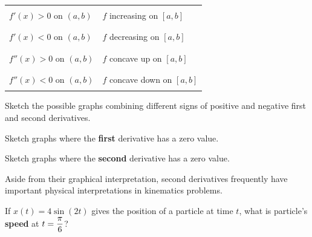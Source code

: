 {\huge
\vsc
\begin{center}
\begin{tabular}{|l|l|} \hline
\qquad \qquad \qquad \qquad \qquad  \qquad \qquad & \qquad  \qquad \qquad \qquad \qquad  \qquad \qquad \\
\qquad $f'(x) > 0 {\mbox{ on }} (a,b)$  &  \qquad $f$ increasing on $[a,b]$  \\
\qquad \qquad \qquad \qquad \qquad & \qquad \qquad \qquad  \qquad \qquad \\
 \hline
\qquad \qquad \qquad \qquad \qquad & \qquad \qquad \qquad  \qquad \qquad \\
\qquad $f'(x) < 0 {\mbox{ on }} (a,b)$  &  \qquad $f$ decreasing on $[a,b]$  \\
\qquad \qquad \qquad \qquad \qquad & \qquad \qquad \qquad  \qquad \qquad \\
 \hline
\qquad \qquad \qquad \qquad \qquad & \qquad \qquad \qquad  \qquad \qquad \\
\qquad $f''(x) > 0 {\mbox{ on }} (a,b)$  &  \qquad $f$ concave up on $[a,b]$  \\ \qquad \qquad \qquad \qquad \qquad & \qquad \qquad \qquad  \qquad \qquad \\
\hline
\qquad \qquad \qquad \qquad \qquad & \qquad \qquad \qquad  \qquad \qquad \\
\qquad $f''(x) < 0 {\mbox{ on }} (a,b)$  &  \qquad $f$ concave down on $[a,b]$ \qquad  \qquad  \\ 
\qquad \qquad \qquad \qquad \qquad & \qquad \qquad \qquad  \qquad \qquad \\
\hline
\end{tabular}
\end{center}
}
\setfont

\newpage 

\problem Sketch the possible graphs combining different signs of
positive and negative first and second derivatives.

\vfill
\vfill


\problem Sketch graphs where the {\bf first} derivative has a zero value. 

\vfill \problem Sketch graphs where the {\bf second} derivative has a
zero value.

\vfill

\newpage

Aside from their graphical interpretation, second derivatives
frequently have important physical interpretations in kinematics
problems.

\problem If $x(t) = 4 \sin(2t)$ gives the position of a particle at
time $t$, what is particle's {\bf speed} at $\displaystyle t=\frac{\pi}{6}$?

